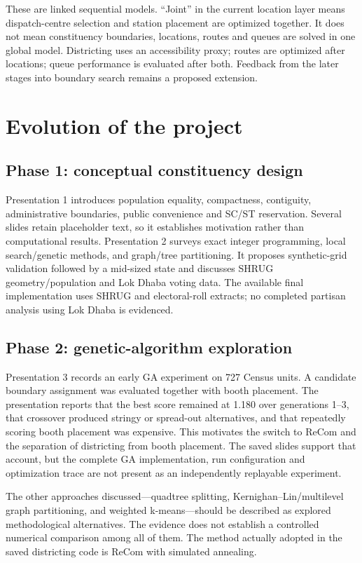\documentclass[11pt,a4paper,oneside]{report}
\newcommand{\source}[1]{\par\nopagebreak[4]{\footnotesize\color{teal}Evidence: #1.}\par}
\begin{document}
These are linked sequential models. ``Joint'' in the current location layer means dispatch-centre selection and station placement are optimized together. It does not mean constituency boundaries, locations, routes and queues are solved in one global model. Districting uses an accessibility proxy; routes are optimized after locations; queue performance is evaluated after both. Feedback from the later stages into boundary search remains a proposed extension.
\source{[S2], [S7]--[S11], [S13]--[S15]}

\chapter{Evolution of the project}
\section{Phase 1: conceptual constituency design}
Presentation 1 introduces population equality, compactness, contiguity, administrative boundaries, public convenience and SC/ST reservation. Several slides retain placeholder text, so it establishes motivation rather than computational results. Presentation 2 surveys exact integer programming, local search/genetic methods, and graph/tree partitioning. It proposes synthetic-grid validation followed by a mid-sized state and discusses SHRUG geometry/population and Lok Dhaba voting data. The available final implementation uses SHRUG and electoral-roll extracts; no completed partisan analysis using Lok Dhaba is evidenced.
\source{[S1]}

\section{Phase 2: genetic-algorithm exploration}
Presentation 3 records an early GA experiment on 727 Census units. A candidate boundary assignment was evaluated together with booth placement. The presentation reports that the best score remained at 1.180 over generations 1--3, that crossover produced stringy or spread-out alternatives, and that repeatedly scoring booth placement was expensive. This motivates the switch to ReCom and the separation of districting from booth placement. The saved slides support that account, but the complete GA implementation, run configuration and optimization trace are not present as an independently replayable experiment.

The other approaches discussed---quadtree splitting, Kernighan--Lin/multilevel graph partitioning, and weighted k-means---should be described as explored methodological alternatives. The evidence does not establish a controlled numerical comparison among all of them. The method actually adopted in the saved districting code is ReCom with simulated annealing.
\source{[S1]}
\end{document}
